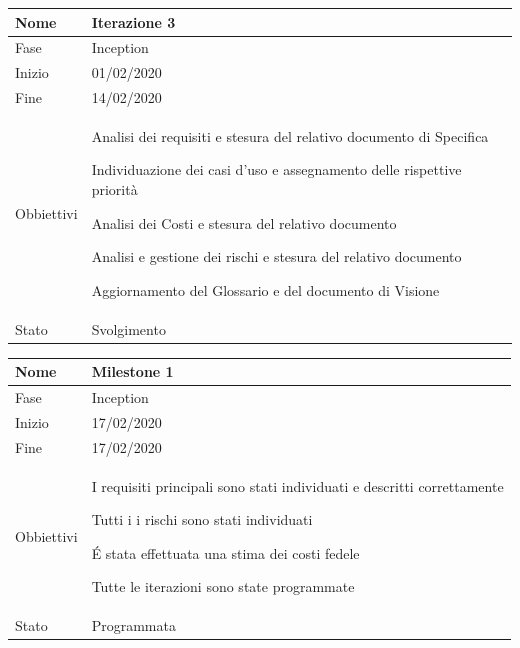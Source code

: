 \begin{center}
\begin{tabular}{ |p{}|p{}|  }
\hline
Nome & Iterazione 3 \\\hline
Fase & Inception \\\hline
Inizio & 01/02/2020 \\\hline
Fine &  14/02/2020 \\\hline
Obbiettivi & 
	\begin{compactitem}
		\item Analisi dei  requisiti e stesura del relativo documento di Specifica
		\item Individuazione dei casi d'uso e assegnamento delle rispettive priorità %
		\item Analisi dei Costi e stesura del relativo documento
		\item Analisi e gestione dei rischi e stesura del relativo documento
		\item Aggiornamento del Glossario e del documento di Visione
	\end{compactitem}\\\hline
Stato &  Svolgimento \\\hline
\end{tabular}
\label{table:3}\newline

\begin{tabular}{ |p{2cm}|p{10cm}|  }
\hline
Nome & Milestone 1\\\hline
Fase & Inception \\\hline
Inizio & 17/02/2020 \\\hline
Fine &  17/02/2020 \\\hline
Obbiettivi & 
	\begin{compactitem}
		\item I requisiti principali sono stati individuati e descritti correttamente
		\item Tutti i i rischi sono stati individuati
		\item \'E stata effettuata una stima dei costi fedele
		\item Tutte le iterazioni sono state programmate
	\end{compactitem}\\\hline
Stato &  Programmata \\\hline
\end{tabular}
\label{table:milestone1}\newline


\end{center}
